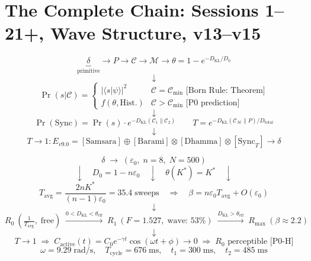 \documentclass[12pt, a4paper]{article}
\begin{document}
\section{The Complete Chain: Sessions 1--21+, Wave Structure, v13--v15}

\begin{keybox}[title={The Full Chain of CRF: From $\delta$ to Liberation}]
\[
  \underbrace{\delta}_{\text{primitive}}
  \to P \to \mathcal{C} \to \mathcal{M}
  \to \theta = 1 - e^{-D_{\mathrm{KL}}/D_0}
\]
\[
  \downarrow
\]
\[
  \Pr(s|\mathcal{C}) =
  \begin{cases}
    |\langle s|\psi\rangle|^2 & \mathcal{C} = \mathcal{C}_{\min} \text{ [Born Rule: Theorem]} \\
    f(\theta, \mathrm{Hist.}) & \mathcal{C} > \mathcal{C}_{\min} \text{ [P0 prediction]}
  \end{cases}
\]
\[
  \downarrow
\]
\[
  \Pr(\mathrm{Sync}) = \Pr(s)\cdot e^{-D_{\mathrm{KL}}(\mathcal{C}_1\|\mathcal{C}_2)}
  \qquad
  T = e^{-D_{\mathrm{KL}}(\mathcal{C}_\mathcal{M}\|P)/D_{\mathrm{total}}}
\]
\[
  \downarrow
\]
\[
  T \to 1 : E_{v9.0} = [\mathrm{Samsara}] \oplus [\mathrm{Barami}]
  \otimes [\mathrm{Dhamma}] \otimes [\mathrm{Sync}_T]
  \longrightarrow \delta
\]
\end{keybox}

\begin{keybox}[title={Extension: Wave Structure and P0-H (v12)}]
\[
\delta \;\to\; (\varepsilon_0,\; n = 8,\; N = 500)
\]
\[
\downarrow\quad D_0 = 1 - n\varepsilon_0 \quad\downarrow\quad \theta(K^*) = K^* \quad\downarrow
\]
\[
T_{\mathrm{avg}} = \frac{2nK^*}{(n-1)\varepsilon_0} = 35.4\;\text{sweeps}
\quad\Rightarrow\quad \beta = n\varepsilon_0 T_{\mathrm{avg}} + O(\varepsilon_0)
\]
\[
\downarrow
\]
{\small\[
R_0\ \left(\tfrac{1}{T_{\mathrm{avg}}},\;\text{free}\right)
\;\xrightarrow{0 < D_{\mathrm{KL}} < \theta_{\mathrm{eff}}}\;
R_1\ \left(F = 1.527,\;\text{wave: }53\%\right)
\;\xrightarrow{D_{\mathrm{KL}} > \theta_{\mathrm{eff}}}\;
R_{\max}\ \left(\beta \approx 2.2\right)
\]}
\[
\downarrow
\]
{\small\[
T \to 1 \;\Rightarrow\; C_{\mathrm{active}}(t) = C_0 e^{-\gamma t}\cos(\omega t + \phi) \to 0
\;\Rightarrow\; R_0 \text{ perceptible [P0-H]}
\]}
\[
\omega = 9.29\;\text{rad/s}, \quad T_{\mathrm{cycle}} = 676\;\text{ms}, \quad
t_1 = 300\;\text{ms}, \quad t_2 = 485\;\text{ms}
\]
\end{keybox}
\end{document}
